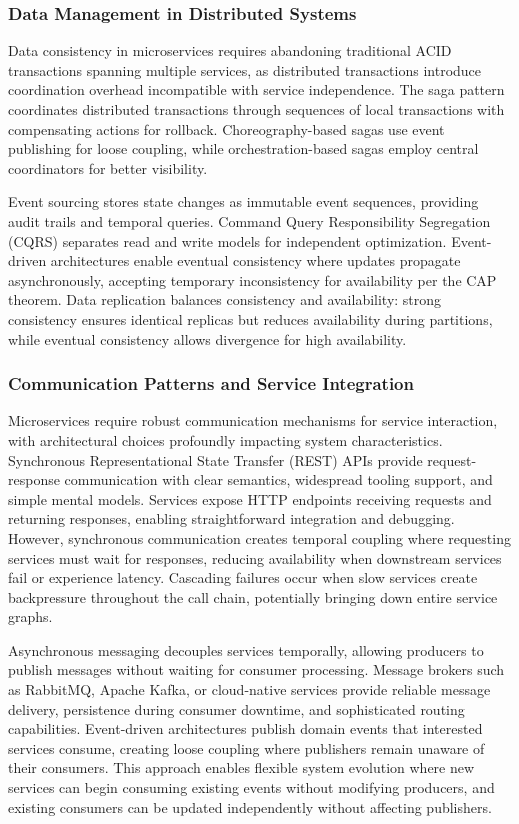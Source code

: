 \documentclass[a4paper, 12pt]{report}
\begin{document}
\subsubsection{Data Management in Distributed Systems}

Data consistency in microservices requires abandoning traditional ACID transactions spanning multiple services, as distributed transactions introduce coordination overhead incompatible with service independence. The saga pattern coordinates distributed transactions through sequences of local transactions with compensating actions for rollback. Choreography-based sagas use event publishing for loose coupling, while orchestration-based sagas employ central coordinators for better visibility.

Event sourcing stores state changes as immutable event sequences, providing audit trails and temporal queries. Command Query Responsibility Segregation (CQRS) separates read and write models for independent optimization. Event-driven architectures enable eventual consistency where updates propagate asynchronously, accepting temporary inconsistency for availability per the CAP theorem. Data replication balances consistency and availability: strong consistency ensures identical replicas but reduces availability during partitions, while eventual consistency allows divergence for high availability.

\subsubsection{Communication Patterns and Service Integration}

Microservices require robust communication mechanisms for service interaction, with architectural choices profoundly impacting system characteristics. Synchronous Representational State Transfer (REST) APIs provide request-response communication with clear semantics, widespread tooling support, and simple mental models. Services expose HTTP endpoints receiving requests and returning responses, enabling straightforward integration and debugging. However, synchronous communication creates temporal coupling where requesting services must wait for responses, reducing availability when downstream services fail or experience latency. Cascading failures occur when slow services create backpressure throughout the call chain, potentially bringing down entire service graphs.

Asynchronous messaging decouples services temporally, allowing producers to publish messages without waiting for consumer processing. Message brokers such as RabbitMQ, Apache Kafka, or cloud-native services provide reliable message delivery, persistence during consumer downtime, and sophisticated routing capabilities. Event-driven architectures publish domain events that interested services consume, creating loose coupling where publishers remain unaware of their consumers. This approach enables flexible system evolution where new services can begin consuming existing events without modifying producers, and existing consumers can be updated independently without affecting publishers.
\end{document}
